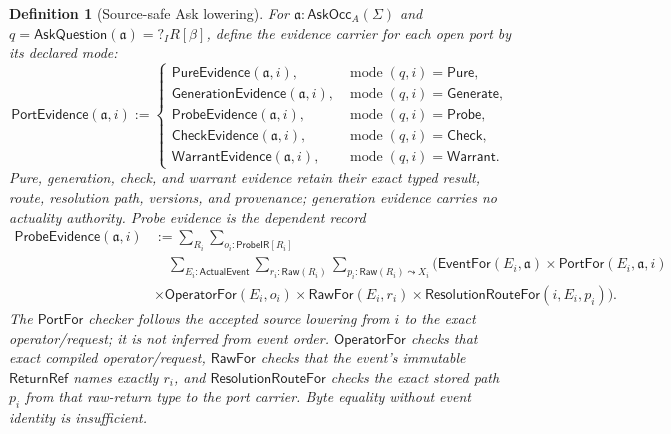 \documentclass[11pt,oneside]{article}
\newtheorem{definition}{Definition}[section]
\newcommand{\Raw}{\mathsf{Raw}}
\newcommand{\ProbeIR}{\mathsf{ProbeIR}}
\newcommand{\ReturnRef}{\mathsf{ReturnRef}}
\newcommand{\AskRef}{\mathfrak a}
\begin{document}
\begin{definition}[Source-safe Ask lowering]\label{def:source-safe-ask-lowering}
For \(\AskRef:\mathsf{AskOcc}_A(\Sigma)\) and
\(q=\mathsf{AskQuestion}(\AskRef)=?_I R[\beta]\), define the evidence carrier for each open port
by its declared mode:
\[
\boxed{
\mathsf{PortEvidence}(\AskRef,i)
:=
\begin{cases}
\mathsf{PureEvidence}(\AskRef,i),
  &\operatorname{mode}(q,i)=\mathsf{Pure},\\
\mathsf{GenerationEvidence}(\AskRef,i),
  &\operatorname{mode}(q,i)=\mathsf{Generate},\\
\mathsf{ProbeEvidence}(\AskRef,i),
  &\operatorname{mode}(q,i)=\mathsf{Probe},\\
\mathsf{CheckEvidence}(\AskRef,i),
  &\operatorname{mode}(q,i)=\mathsf{Check},\\
\mathsf{WarrantEvidence}(\AskRef,i),
  &\operatorname{mode}(q,i)=\mathsf{Warrant}.
\end{cases}
}
\]
Pure, generation, check, and warrant evidence retain their exact typed result, route, resolution
path, versions, and provenance; generation evidence carries no actuality authority.  Probe evidence is the dependent
record
\[
\boxed{
\begin{aligned}
\mathsf{ProbeEvidence}(\AskRef,i)
&:=\sum_{R_i}\sum_{o_i:\ProbeIR[R_i]}\\[-1mm]
&\quad\sum_{E_i:\mathsf{ActualEvent}}\sum_{r_i:\Raw(R_i)}
\sum_{p_i:\Raw(R_i)\leadsto X_i}
\bigl(\mathsf{EventFor}(E_i,\AskRef)
\times\mathsf{PortFor}(E_i,\AskRef,i)\\
&\times\mathsf{OperatorFor}(E_i,o_i)
\times\mathsf{RawFor}(E_i,r_i)
\times\mathsf{ResolutionRouteFor}(i,E_i,p_i)\bigr).
\end{aligned}
}
\]
The \(\mathsf{PortFor}\) checker follows the accepted source lowering from \(i\) to the exact
operator/request; it is not inferred from event order.  \(\mathsf{OperatorFor}\) checks that exact
compiled operator/request, \(\mathsf{RawFor}\) checks that the event's immutable
\(\ReturnRef\) names exactly \(r_i\), and \(\mathsf{ResolutionRouteFor}\) checks the exact stored
path \(p_i\) from that raw-return type to the port carrier.  Byte equality without event identity
is insufficient.


\end{definition}
\end{document}
